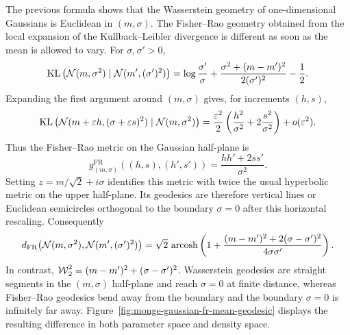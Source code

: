 \begin{rem}\label{rem-fisher-rao-gaussian-mean}
	The previous formula shows that the Wasserstein geometry of one-dimensional Gaussians is Euclidean in $(m,\sigma)$. The Fisher--Rao geometry obtained from the local expansion of the Kullback--Leibler divergence is different as soon as the mean is allowed to vary. For $\sigma,\sigma'>0$,
	\[
		\operatorname{KL}\big(\mathcal{N}(m,\sigma^2)\mid\mathcal{N}(m',(\sigma')^2)\big)
		=
		\log\frac{\sigma'}{\sigma}
		+
		\frac{\sigma^2+(m-m')^2}{2(\sigma')^2}
		-
		\frac12 .
	\]
	Expanding the first argument around $(m,\sigma)$ gives, for increments $(h,s)$,
	\[
		\operatorname{KL}\big(\mathcal{N}(m+\varepsilon h,(\sigma+\varepsilon s)^2)
		\mid \mathcal{N}(m,\sigma^2)\big)
		=
		\frac{\varepsilon^2}{2}
		\left(\frac{h^2}{\sigma^2}+2\frac{s^2}{\sigma^2}\right)
		+o(\varepsilon^2).
	\]
	Thus the Fisher--Rao metric on the Gaussian half-plane is
	\[
		g_{(m,\sigma)}^{\mathrm{FR}}((h,s),(h',s'))
		=
		\frac{hh'+2ss'}{\sigma^2}.
	\]
	Setting $z=m/\sqrt2+i\sigma$ identifies this metric with twice the usual hyperbolic metric on the upper half-plane. Its geodesics are therefore vertical lines or Euclidean semicircles orthogonal to the boundary $\sigma=0$ after this horizontal rescaling. Consequently
	\[
		d_{\mathrm{FR}}\big(\mathcal{N}(m,\sigma^2),\mathcal{N}(m',(\sigma')^2)\big)
		=
		\sqrt2\,\operatorname{arcosh}\left(
		1+\frac{(m-m')^2+2(\sigma-\sigma')^2}{4\sigma\sigma'}
		\right).
	\]
	In contrast, $\operatorname{\mathcal{W}}_2^2=(m-m')^2+(\sigma-\sigma')^2$. Wasserstein geodesics are straight segments in the $(m,\sigma)$ half-plane and reach $\sigma=0$ at finite distance, whereas Fisher--Rao geodesics bend away from the boundary and the boundary $\sigma=0$ is infinitely far away. Figure~\ref{fig:monge-gaussian-fr-mean-geodesic} displays the resulting difference in both parameter space and density space.
\end{rem}

